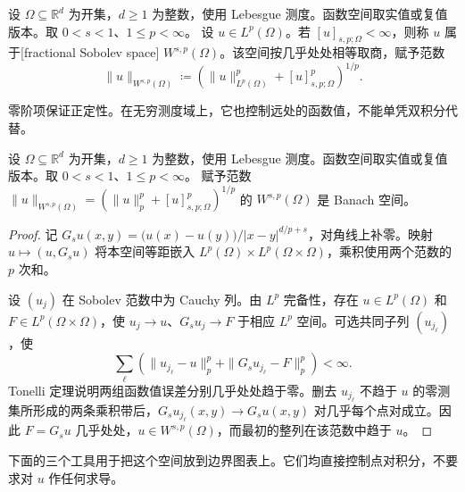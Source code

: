 \begin{definition}\label{b1:def:fractional-sobolev}
设 \(\Omega\subseteq\mathbb R^d\) 为开集，\(d\geq1\) 为整数，使用 Lebesgue 测度。函数空间取实值或复值版本。取 \(0<s<1\)、\(1\leq p<\infty\)。
设 \(u\in L^p(\Omega)\)。若 \([u]_{s,p;\Omega}<\infty\)，则称 \(u\) 属于[fractional Sobolev space] \(W^{s,p}(\Omega)\)。该空间按几乎处处相等取商，赋予范数
\[
 \|u\|_{W^{s,p}(\Omega)}
 \coloneqq\left(\|u\|_{L^p(\Omega)}^p+[u]_{s,p;\Omega}^p\right)^{1/p}.
\]
\end{definition}

零阶项保证正定性。在无穷测度域上，它也控制远处的函数值，不能单凭双积分代替。

\begin{theorem}\label{b1:thm:fractional-sobolev-complete}
设 \(\Omega\subseteq\mathbb R^d\) 为开集，\(d\geq1\) 为整数，使用 Lebesgue 测度。函数空间取实值或复值版本。取 \(0<s<1\)、\(1\leq p<\infty\)。
赋予范数 \(\|u\|_{W^{s,p}(\Omega)}=(\|u\|_p^p+[u]_{s,p;\Omega}^p)^{1/p}\) 的 \(W^{s,p}(\Omega)\) 是 Banach 空间。
\end{theorem}
\begin{proof}
记 \(G_su(x,y)=\bigl(u(x)-u(y)\bigr)/|x-y|^{d/p+s}\)，对角线上补零。映射 \(u\mapsto(u,G_su)\) 将本空间等距嵌入
\(L^p(\Omega)\times L^p(\Omega\times\Omega)\)，乘积使用两个范数的 \(p\) 次和。

设 \((u_j)\) 在 Sobolev 范数中为 Cauchy 列。由 \(L^p\) 完备性，存在 \(u\in L^p(\Omega)\) 和 \(F\in L^p(\Omega\times\Omega)\)，使 \(u_j\to u\)、\(G_su_j\to F\) 于相应 \(L^p\) 空间。可选共同子列 \((u_{j_\ell})\)，使
\[
 \sum_\ell\left(\|u_{j_\ell}-u\|_p^p+
                       \|G_su_{j_\ell}-F\|_p^p\right)<\infty.
\]
Tonelli 定理说明两组函数值误差分别几乎处处趋于零。删去 \(u_{j_\ell}\) 不趋于 \(u\) 的零测集所形成的两条乘积带后，\(G_su_{j_\ell}(x,y)\to G_su(x,y)\) 对几乎每个点对成立。因此 \(F=G_su\) 几乎处处，\(u\in W^{s,p}(\Omega)\)，而最初的整列在该范数中趋于 \(u\)。
\end{proof}

下面的三个工具用于把这个空间放到边界图表上。它们均直接控制点对积分，不要求对 \(u\) 作任何求导。

